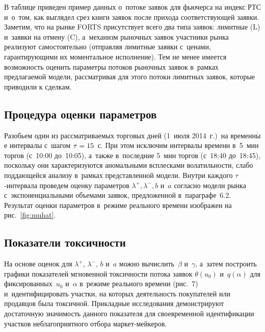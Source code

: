 \begin{multicols}{2}
В таблице приведен пример данных о~потоке заявок для фьючерса на
индекс РТС и~о~том, как выглядел срез книги заявок после прихода
соответствующей заявки. Заметим, что на рынке FORTS присутствует
всего два типа заявок: лимитные (L) и~заявки на отмену (C),
а~механизм рыночных заявок участники рынка реализуют самостоятельно
(отправляя лимитные заявки с~ценами, гарантирующими их моментальное
исполнение). Тем не менее имеется возможность оценить параметры
потоков рыночных заявок в~рамках предлагаемой модели, рассматривая для
этого потоки лимитных заявок, которые приводили к сделкам.


\subsection{Процедура оценки параметров}



Разобьем один из рассматриваемых торговых дней (1~июля 2014~г.)\ на
временн$\acute{\mbox{ы}}$е интервалы с~шагом $\tau \hm= 15$~с.
При этом исключим интервалы времени в~5~мин торгов (с~10:00
до~10:05), а~также в~последние 5~мин торгов (с~18:40 до~18:45),
поскольку они характеризуются аномальными всплесками волатильности,
слабо поддающейся анализу в~рамках представленной модели. Внутри
каждого $\tau$-ин\-тер\-ва\-ла проведем оценку параметров $\lambda^+,
\lambda^-, b$ и~$a$ согласно модели рынка с~экспоненциальными
объемами заявок, предложенной в~параграфе~6.2. Результат оценки
параметров в~режиме реального времени изображен на рис.~\ref{fig:muhat}.


\subsection{Показатели токсичности}



На основе оценок для $\lambda^+$, $\lambda^-$, $b$ и~$a$ можно вы\-чис\-лить~$\beta$
и~$\gamma$, а~затем построить графики показателей мгновенной токсичности
потока заявок
$\theta(u_0)$ и~$q(\alpha)$ для фиксированных~$u_0$ и~$\alpha$
в~режиме реального времени (рис.~7)
и~идентифицировать участки, на которых деятельность покупателей или
продавцов была токсичной. Прикладные исследования демонстрируют
достаточную значимость данного показателя для своевременной
идентификации участков неблагоприятного отбора мар\-кет-мей\-керов.


\end{multicols}
